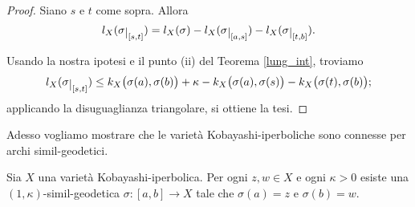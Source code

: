 \begin{proof}
    Siano $s$ e $t$ come sopra. Allora
    $$l_X(\sigma\restrict{[s,t]})=l_X(\sigma)-l_X(\sigma\restrict{[a,s]})-l_X(\sigma\restrict{[t,b]}).$$

    Usando la nostra ipotesi e il punto (ii) del Teorema \ref{lung_int}, troviamo
    $$l_X(\sigma\restrict{[s,t]}) \le k_X\big(\sigma(a),\sigma(b)\big)+\kappa-k_X\big(\sigma(a),\sigma(s)\big)-k_X\big(\sigma(t),\sigma(b)\big);$$
    applicando la disuguaglianza triangolare, si ottiene la tesi.
\end{proof}

 Adesso vogliamo mostrare che le varietà Kobayashi-iperboliche sono connesse per archi simil-geodetici.

\begin{thm} \label{similgeo_conn}
    Sia $X$ una varietà Kobayashi-iperbolica. Per ogni $z,w \in X$ e ogni $\kappa>0$ esiste una $(1,\kappa)$-simil-geodetica $\sigma:[a,b]\longrightarrow X$ tale che $\sigma(a)=z$ e $\sigma(b)=w$.
\end{thm}

